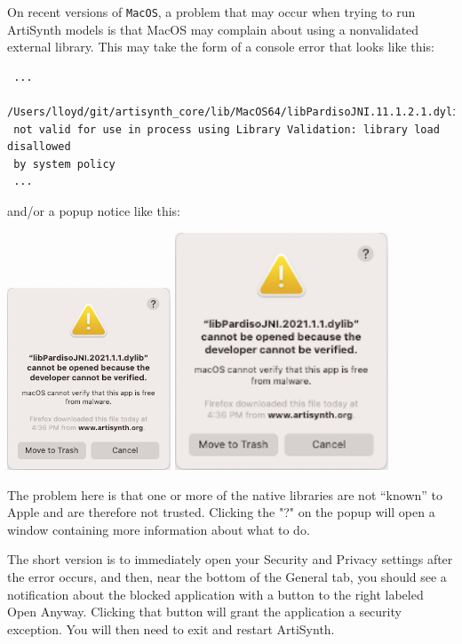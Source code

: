 \begin{sideblock}
On recent versions of {\tt MacOS}, a problem that may occur when trying to run
ArtiSynth models is that MacOS may complain about using a nonvalidated external
library. This may take the form of a console error that looks like this:
\begin{verbatim}
 ...
 /Users/lloyd/git/artisynth_core/lib/MacOS64/libPardisoJNI.11.1.2.1.dylib)
 not valid for use in process using Library Validation: library load disallowed
 by system policy 
 ...
\end{verbatim}
and/or a popup notice like this:
\begin{center}
\iflatexml
  \includegraphics[]{images/MacSecurityNotice}
\else
  \includegraphics[width=2.5in]{images/MacSecurityNotice}
\fi
\end{center}
The problem here is that one or more of the native libraries are not ``known''
to Apple and are therefore not trusted. Clicking the "?" on the popup will
open a window containing more information about what to do.

The short version is to immediately open your Security and Privacy
settings after the error occurs, and then, near the bottom of the {\sf
General} tab, you should see a notification about the blocked
application with a button to the right labeled {\sf Open
Anyway}. Clicking that button will grant the application a security
exception. You will then need to exit and restart ArtiSynth.
\end{sideblock}


